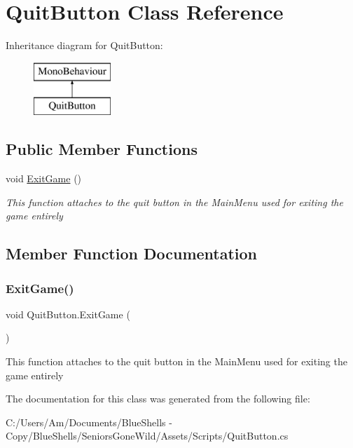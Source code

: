 \hypertarget{class_quit_button}{}\section{Quit\+Button Class Reference}
\label{class_quit_button}
Inheritance diagram for Quit\+Button\+:\begin{figure}[H]
\begin{center}
\leavevmode
\includegraphics[height=2.000000cm]{class_quit_button}
\end{center}
\end{figure}
\subsection*{Public Member Functions}
\begin{DoxyCompactItemize}
\item 
void \mbox{\hyperlink{class_quit_button_ad8a6d288733d21c2376a31fb8df7b0ac}{Exit\+Game}} ()
\begin{DoxyCompactList}\small\item\em This function attaches to the quit button in the Main\+Menu used for exiting the game entirely \end{DoxyCompactList}\end{DoxyCompactItemize}


\subsection{Member Function Documentation}
\mbox{\label{class_quit_button_ad8a6d288733d21c2376a31fb8df7b0ac}} 
\subsubsection{\texorpdfstring{Exit\+Game()}{ExitGame()}}
{\footnotesize\ttfamily void Quit\+Button.\+Exit\+Game (\begin{DoxyParamCaption}{ }\end{DoxyParamCaption})}



This function attaches to the quit button in the Main\+Menu used for exiting the game entirely 



The documentation for this class was generated from the following file\+:\begin{DoxyCompactItemize}
\item 
C\+:/\+Users/\+Am/\+Documents/\+Blue\+Shells -\/ Copy/\+Blue\+Shells/\+Seniors\+Gone\+Wild/\+Assets/\+Scripts/Quit\+Button.\+cs\end{DoxyCompactItemize}
